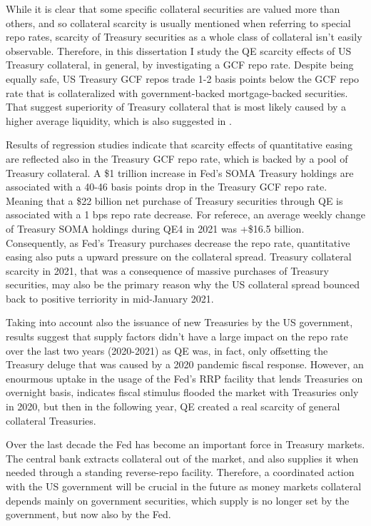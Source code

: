 \documentclass[11pt,a4paper,english,oneside]{article}
\begin{document}
While it is clear that some specific collateral securities are valued more than others, and so collateral scarcity is usually mentioned when referring to special repo rates, scarcity of Treasury securities as a whole class of collateral isn't easily observable. Therefore, in this dissertation I study the QE scarcity effects of US Treasury collateral, in general, by investigating a GCF repo rate. Despite being equally safe, US Treasury GCF repos trade 1-2 basis points below the GCF repo rate that is collateralized with government-backed mortgage-backed securities. That suggest superiority of Treasury collateral that is most likely caused by a higher average liquidity, which is also suggested in \citet{krishnamurthy2012}.

Results of regression studies indicate that scarcity effects of quantitative easing are reflected also in the Treasury GCF repo rate, which is backed by a pool of Treasury collateral. A \$1 trillion increase in Fed's SOMA Treasury holdings are associated with a 40-46 basis points drop in the Treasury GCF repo rate. Meaning that a \$22 billion net purchase of Treasury securities through QE is associated with a 1 bps repo rate decrease. For referece, an average weekly change of Treasury SOMA holdings during QE4 in 2021 was +\$16.5 billion. Consequently, as Fed's Treasury purchases decrease the repo rate, quantitative easing also puts a upward pressure on the collateral spread. Treasury collateral scarcity in 2021, that was a consequence of massive purchases of Treasury securities, may also be the primary reason why the US collateral spread bounced back to positive terriority in mid-January 2021.

Taking into account also the issuance of new Treasuries by the US government, results suggest that supply factors didn't have a large impact on the repo rate over the last two years (2020-2021) as QE was, in fact, only offsetting the Treasury deluge that was caused by a 2020 pandemic fiscal response. However, an enourmous uptake in the usage of the Fed's RRP facility that lends Treasuries on overnight basis, indicates fiscal stimulus flooded the market with Treasuries only in 2020, but then in the following year, QE created a real scarcity of general collateral Treasuries.

Over the last decade the Fed has become an important force in Treasury markets. The central bank extracts collateral out of the market, and also supplies it when needed through a standing reverse-repo facility. Therefore, a coordinated action with the US government will be crucial in the future as money markets collateral depends mainly on government securities, which supply is no longer set by the government, but now also by the Fed. 
\end{document}
